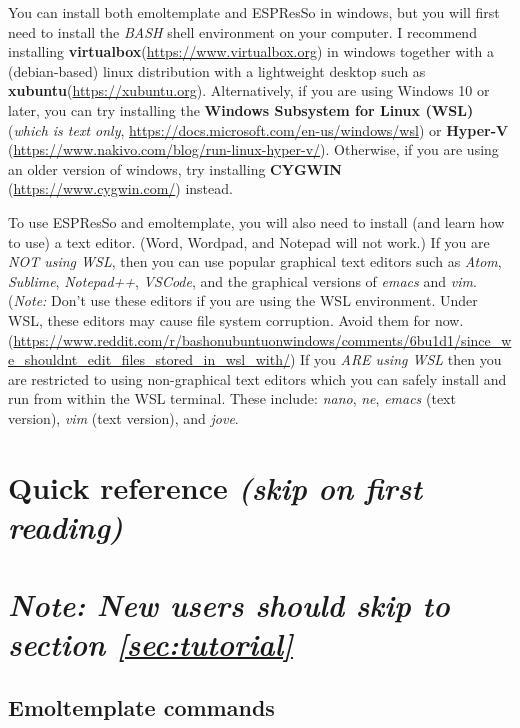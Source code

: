 \documentclass[11pt]{article}
\begin{document}
You can install both emoltemplate and ESPResSo in windows,
but you will first need to install the \textit{BASH}
shell environment on your computer.  I recommend installing
\textbf{virtualbox}(\url{https://www.virtualbox.org}) in windows together
with a (debian-based) linux distribution with a lightweight desktop such as
\textbf{xubuntu}(\url{https://xubuntu.org}).
Alternatively, if you are using Windows 10 or later, you can try installing the
\textbf{Windows Subsystem for Linux (WSL)}
(\textit{which is text only},
 \url{https://docs.microsoft.com/en-us/windows/wsl})
or
\textbf{Hyper-V}
(\url{https://www.nakivo.com/blog/run-linux-hyper-v/}).
Otherwise, if you are using an older version of windows, try installing
\textbf{CYGWIN}
(\url{https://www.cygwin.com/}) instead.

To use ESPResSo and emoltemplate, you will also need to install (and learn
how to use) a text editor.  (Word, Wordpad, and Notepad will not work.)
If you are \textit{NOT using WSL}, then you 
can use popular graphical text editors such as
\textit{Atom}, \textit{Sublime},
\textit{Notepad++}, \textit{VSCode},
and the graphical versions of \textit{emacs} and \textit{vim}.
(\textit{Note:} Don't use these editors if you are using the WSL environment.
Under WSL, these editors may cause file system corruption.
Avoid them for now. (\url{https://www.reddit.com/r/bashonubuntuonwindows/comments/6bu1d1/since_we_shouldnt_edit_files_stored_in_wsl_with/})
If you \textit{ARE using WSL} then you are restricted to using
non-graphical text editors which you can safely install and
run from within the WSL terminal.
These include: \textit{nano}, \textit{ne},
\textit{emacs} (text version),
\textit{vim} (text version), and \textit{jove}.



\pagebreak
\section{Quick reference \textit{(skip on first reading)}}

\section*{
\textit{Note: New users should skip to section \ref{sec:tutorial}}
}

\subsection{Emoltemplate commands}
\end{document}
